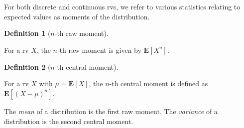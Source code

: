 \documentclass[
  a4paper,
  oneside]{book}
\theoremstyle{definition}
\newtheorem{definition}{Definition}[chapter]
\theoremstyle{definition}
\theoremstyle{definition}
\theoremstyle{plain}
\theoremstyle{remark}
\begin{document}
For both discrete and continuous rvs, we refer to various statistics
relating to expected values as moments of the distribution.

\begin{definition}[\(n\)-th raw
moment]\protect\hypertarget{def-raw-moments}{}\label{def-raw-moments}

For a rv \(X\), the \(n\)-th raw moment is given by \(\mathbf{E}[X^n]\).

\end{definition}

\begin{definition}[\(n\)-th central
moment]\protect\hypertarget{def-central-moments}{}\label{def-central-moments}

For a rv \(X\) with \(\mu = \mathbf{E}[X]\), the \(n\)-th central moment
is defined as \(\mathbf{E}[(X-\mu)^n]\).

\end{definition}

The \emph{mean} of a distribution is the first raw moment. The
\emph{variance} of a distribution is the second central moment.

\begin{table}

\caption{\label{tbl-moments}First three moments for a rv \(X\) with mean
\(\mu = \mathbf{E}[X]\).}

\begin{minipage}{0.50\linewidth}



\end{minipage}%
%
\begin{minipage}{0.50\linewidth}



\end{minipage}%

\end{table}%
\end{document}
